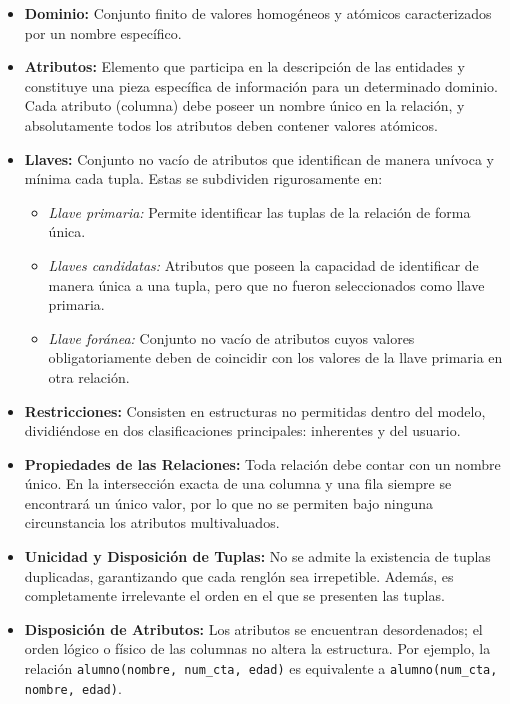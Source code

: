 \begin{itemize}
    \item \textbf{Dominio:} Conjunto finito de valores homogéneos y atómicos caracterizados por un nombre específico.
    \item \textbf{Atributos:} Elemento que participa en la descripción de las entidades y constituye una pieza específica de información para un determinado dominio. Cada atributo (columna) debe poseer un nombre único en la relación, y absolutamente todos los atributos deben contener valores atómicos.
    \item \textbf{Llaves:} Conjunto no vacío de atributos que identifican de manera unívoca y mínima cada tupla. Estas se subdividen rigurosamente en:
    \begin{itemize}
        \item \textit{Llave primaria:} Permite identificar las tuplas de la relación de forma única.
        \item \textit{Llaves candidatas:} Atributos que poseen la capacidad de identificar de manera única a una tupla, pero que no fueron seleccionados como llave primaria.
        \item \textit{Llave foránea:} Conjunto no vacío de atributos cuyos valores obligatoriamente deben de coincidir con los valores de la llave primaria en otra relación.
    \end{itemize}
    \item \textbf{Restricciones:} Consisten en estructuras no permitidas dentro del modelo, dividiéndose en dos clasificaciones principales: inherentes y del usuario.
    \item \textbf{Propiedades de las Relaciones:} Toda relación debe contar con un nombre único. En la intersección exacta de una columna y una fila siempre se encontrará un único valor, por lo que no se permiten bajo ninguna circunstancia los atributos multivaluados.
    \item \textbf{Unicidad y Disposición de Tuplas:} No se admite la existencia de tuplas duplicadas, garantizando que cada renglón sea irrepetible. Además, es completamente irrelevante el orden en el que se presenten las tuplas.
    \item \textbf{Disposición de Atributos:} Los atributos se encuentran desordenados; el orden lógico o físico de las columnas no altera la estructura. Por ejemplo, la relación \texttt{alumno(nombre, num\_cta, edad)} es equivalente a \texttt{alumno(num\_cta, nombre, edad)}.
\end{itemize}
